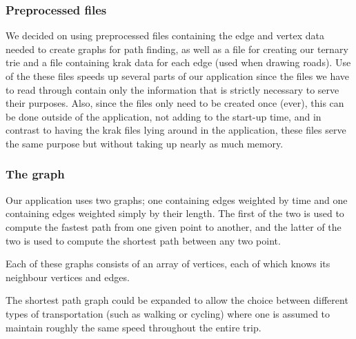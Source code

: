 \subsubsection{Preprocessed files}
We decided on using preprocessed files containing the edge and vertex data needed to create graphs for path finding, as well as a file for creating our ternary trie and a file containing krak data for each edge (used when drawing roads). Use of the these files speeds up several parts of our application since the files we have to read through contain only the information that is strictly necessary to serve their purposes. Also, since the files only need to be created once (ever), this can be done outside of the application, not adding to the start-up time, and in contrast to having the krak files lying around in the application, these files serve the same purpose but without taking up nearly as much memory.

\subsubsection{The graph}
Our application uses two graphs; one containing edges weighted by time and one containing edges weighted simply by their length. The first of the two is used to compute the fastest path from one given point to another, and the latter of the two is used to compute the shortest path between any two point. 

Each of these graphs consists of an array of vertices, each of which knows its neighbour vertices and edges.		

The shortest path graph could be expanded to allow the choice between different types of transportation (such as walking or cycling) where one is assumed to maintain roughly the same speed throughout the entire trip.